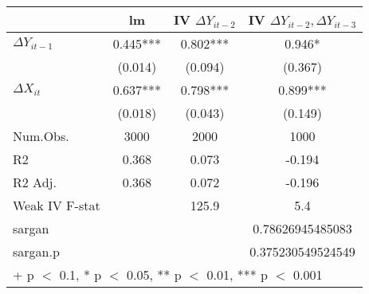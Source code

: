 \begin{table}
\centering
\begin{tabular}[t]{lccc}
\toprule
  & lm & IV $\Delta Y_{it-2}$ & IV $\Delta Y_{it-2},\Delta Y_{it-3}$\\
\midrule
$\Delta Y_{it-1}$ & 0.445*** & 0.802*** & 0.946*\\
 & (0.014) & (0.094) & (0.367)\\
$\Delta X_{it}$ & 0.637*** & 0.798*** & 0.899***\\
 & (0.018) & (0.043) & (0.149)\\
\midrule
Num.Obs. & 3000 & 2000 & 1000\\
R2 & 0.368 & 0.073 & -0.194\\
R2 Adj. & 0.368 & 0.072 & -0.196\\
Weak IV F-stat &  & 125.9 & 5.4\\
sargan &  &  & 0.78626945485083\\
sargan.p &  &  & 0.375230549524549\\
\bottomrule
\multicolumn{4}{l}{\rule{0pt}{1em}+ p $<$ 0.1, * p $<$ 0.05, ** p $<$ 0.01, *** p $<$ 0.001}\\
\end{tabular}
\end{table}
